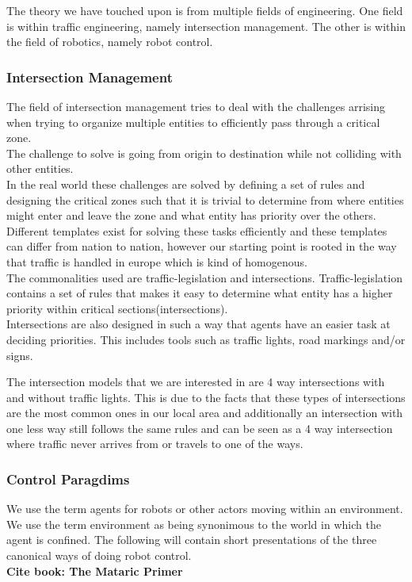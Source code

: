 The theory we have touched upon is from multiple fields of engineering. One field is within traffic engineering, namely intersection management. The other is within the field of robotics, namely robot control.

\subsubsection{Intersection Management}
The field of intersection management tries to deal with the challenges arrising when trying to organize multiple entities to efficiently pass through a critical zone.\\
The challenge to solve is going from origin to destination while not colliding with other entities.\\
In the real world these challenges are solved by defining a set of rules and designing the critical zones such that it is trivial to determine from where entities might enter and leave the zone and what entity has priority over the others.\\

Different templates exist for solving these tasks efficiently and these templates can differ from nation to nation, however our starting point is rooted in the way that traffic is handled in europe which is kind of homogenous.\\
The commonalities used are traffic-legislation and intersections.
Traffic-legislation contains a set of rules that makes it easy to determine what entity has a higher priority within critical sections(intersections).\\
Intersections are also designed in such a way that agents have an easier task at deciding priorities. 
This includes tools such as traffic lights, road markings and/or signs.

The intersection models that we are interested in are 4 way intersections with and without traffic lights.
This is due to the facts that these types of intersections are the most common ones in our local area and additionally an intersection with one less way still follows the same rules and can be seen as a 4 way intersection where traffic never arrives from or travels to one of the ways.

\subsubsection{Control Paragdims}
We use the term agents for robots or other actors moving within an environment.\\
We use the term environment as being synonimous to the world in which the agent is confined.
The following will contain short presentations of the three canonical ways of doing robot control.\\
\textbf{ Cite book: The Mataric Primer }


